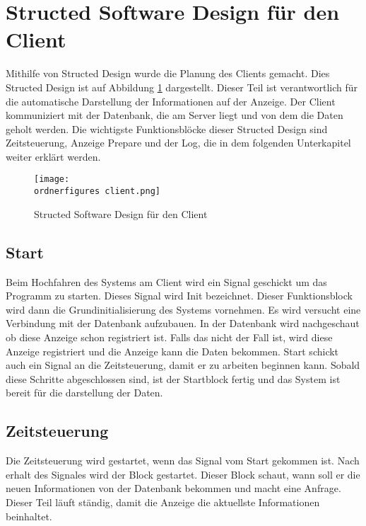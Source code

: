 
\section{Structed Software Design für den Client}

Mithilfe von Structed Design wurde die Planung des Clients gemacht. Dies Structed Design ist auf Abbildung \ref{fi:structed_design_client} dargestellt. 
Dieser Teil ist verantwortlich f\"{u}r die automatische Darstellung der Informationen auf der Anzeige. Der Client kommuniziert mit der Datenbank, die am Server liegt und von dem die Daten geholt werden. Die wichtigste Funktionsbl\"{o}cke dieser Structed Design sind Zeitsteuerung, Anzeige Prepare und der Log, die in dem folgenden Unterkapitel weiter erkl\"{a}rt werden.

\begin{figure}[ht]
	\centering
	\texttt{[image: \\ordnerfigures client.png]}
	\caption{Structed Software Design für den Client}
	\label{fi:structed_design_client}
\end{figure}

\subsection{Start}
Beim Hochfahren des Systems am Client wird ein Signal geschickt um das Programm zu starten. Dieses Signal wird Init bezeichnet. Dieser Funktionsblock wird dann die Grundinitialisierung des Systems vornehmen. Es wird versucht eine Verbindung mit der Datenbank aufzubauen. In der Datenbank wird nachgeschaut ob diese Anzeige schon registriert ist. Falls das nicht der Fall ist, wird diese Anzeige registriert und die Anzeige kann die Daten bekommen. Start schickt auch ein Signal an die Zeitsteuerung, damit er zu arbeiten beginnen kann. Sobald diese Schritte abgeschlossen sind, ist der Startblock fertig und das System ist bereit f\"ur die darstellung der Daten.

\subsection{Zeitsteuerung}
Die Zeitsteuerung wird gestartet, wenn das Signal vom Start gekommen ist. Nach erhalt des Signales wird der Block gestartet. Dieser Block schaut, wann soll er die neuen Informationen von der Datenbank bekommen und macht eine Anfrage. Dieser Teil l\"auft st\"andig, damit die Anzeige die aktuellste Informationen beinhaltet.

